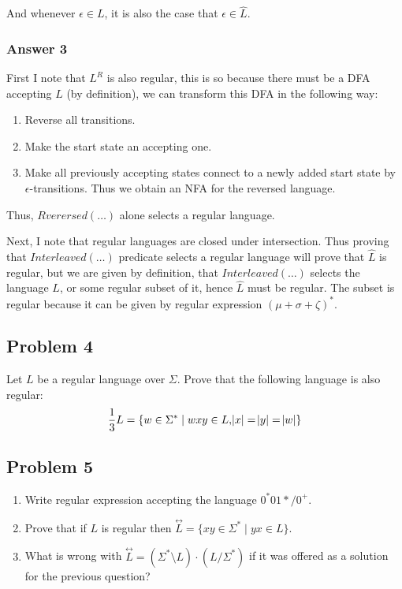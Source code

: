 \documentclass[11pt]{article}
\begin{document}
And whenever \(\epsilon \in L\), it is also the case that \(\epsilon \in \hat{L}\).

\subsubsection{Answer 3}
\label{sec:orgheadline5}
First I note that \(L^R\) is also regular, this is so because there must be a
DFA accepting \(L\) (by definition), we can transform this DFA in the following way:
\begin{enumerate}
\item Reverse all transitions.
\item Make the start state an accepting one.
\item Make all previously accepting states connect to a newly added start state by
\(\epsilon\)-transitions.  Thus we obtain an NFA for the reversed language.
\end{enumerate}

Thus, \(Rverersed(\dots)\) alone selects a regular language.

Next, I note that regular languages are closed under intersection.  Thus
proving that \(Interleaved(\dots)\) predicate selects a regular language will
prove that \(\hat{L}\) is regular, but we are given by definition, that
\(Interleaved(\dots)\) selects the language \(L\), or some regular subset of it,
hence \(\hat{L}\) must be regular.  The subset is regular because it can be
given by regular expression \((\mu+\sigma+\zeta)^*\).

\subsection{Problem 4}
\label{sec:orgheadline7}
Let \(L\) be a regular language over \(\Sigma\).  Prove that the following
language is also regular:
\begin{align*}
  \frac{1}{3}L = \{ w \in \Sigma^* \;|\; wxy \in L, \abs{x} = \abs{y} = \abs{w} \}
\end{align*}

\subsection{Problem 5}
\label{sec:orgheadline8}
\begin{enumerate}
\item Write regular expression accepting the language \(0^*01*/0^+\).
\item Prove that if \(L\) is regular then
\(\overset{\leftrightarrow}{L}=\{xy \in \Sigma^* \;|\; yx \in
      L\}\).
\item What is wrong with \(\overset{\leftrightarrow}{L} = (\Sigma^*
      \setminus L) \cdot (L / \Sigma^*)\) if it was offered as a solution for the
previous question?
\end{enumerate}
\end{document}
